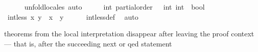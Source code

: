 \begin{isabellebody}
\ \ \ \ \isamarkupfalse%
\ unfold{\isacharunderscore}{\kern0pt}locales\ auto\isanewline
\ \ \isamarkupfalse%
\ \isamarkupfalse%
\ int{\isacharcolon}{\kern0pt}\ partial{\isacharunderscore}{\kern0pt}order\ {\isachardoublequoteopen}{\isacharparenleft}{\kern0pt}{\isasymle}{\isacharparenright}{\kern0pt}\ {\isacharcolon}{\kern0pt}{\isacharcolon}{\kern0pt}\ {\isacharbrackleft}{\kern0pt}int{\isacharcomma}{\kern0pt}\ int{\isacharbrackright}{\kern0pt}\ {\isasymRightarrow}\ bool{\isachardoublequoteclose}\ \isacommand{{\isachardot}{\kern0pt}}\isamarkupfalse%
\isanewline
\ \ \isamarkupfalse%
\ {\isachardoublequoteopen}int{\isachardot}{\kern0pt}less\ x\ y\ {\isacharequal}{\kern0pt}\ {\isacharparenleft}{\kern0pt}x\ {\isacharless}{\kern0pt}\ y{\isacharparenright}{\kern0pt}{\isachardoublequoteclose}\isanewline
\ \ \ \ \isamarkupfalse%
\ int{\isachardot}{\kern0pt}less{\isacharunderscore}{\kern0pt}def\ \isamarkupfalse%
\ auto\isanewline
{}\isamarkupfalse%
%
\endisatagproof
{\isafoldproof}%
%
\isadelimproof
%
\endisadelimproof
%
\begin{isamarkuptext}%
theorems from the local interpretation disappear after leaving the proof context — that is,
after the succeeding next or qed statement%
\end{isamarkuptext}\isamarkuptrue%
%
\isadelimtheory
%
\endisadelimtheory
%
\isatagtheory
{}\isamarkupfalse%
%
\endisatagtheory
{\isafoldtheory}%
%
\isadelimtheory
%
\endisadelimtheory
%
\end{isabellebody}%
\endinput
